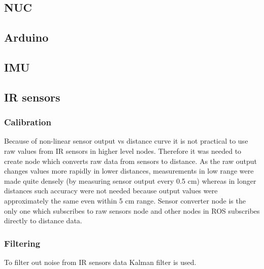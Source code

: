 \subsection{NUC}
\subsection{Arduino}
\subsection{IMU}
\subsection{IR sensors}
\subsubsection{Calibration}

Because of non-linear sensor output vs distance curve it is not practical to use raw values from IR sensors in higher level nodes. Therefore it was needed to create node which converts raw data from sensors to distance. As the raw output changes values more rapidly in lower distances, measurements in low range were made quite densely (by measuring sensor output every 0.5 cm) whereas in longer distances such accuracy were not needed because output values were approximately the same even within 5 cm range. Sensor converter node is the only one which subscribes to raw sensors node and other nodes in ROS subscribes directly to distance data.

\subsubsection{Filtering}

To filter out noise from IR sensors data Kalman filter is used.